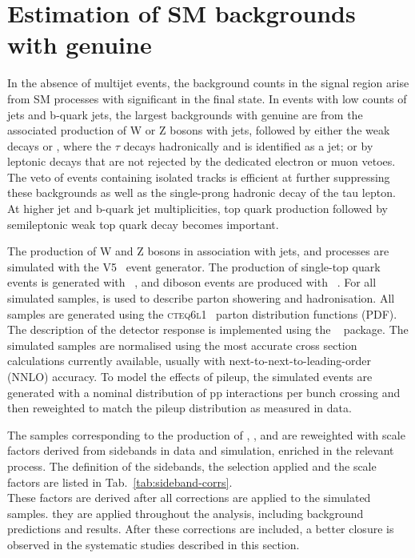 \section{Estimation of SM backgrounds with genuine \ptvecmiss}
\label{sec:ewk_background}

In the absence of multijet events, the background counts in the signal
region arise from SM processes with significant \ETmiss in the final
state. In events with low counts of jets and b-quark jets, the largest
backgrounds with genuine \ptvecmiss are from the associated production of
W or Z bosons with jets, followed by either the weak decays \znunu or
\wtaunu, where the $\tau$ decays hadronically and is identified as a
jet; or by leptonic decays that are not rejected by the dedicated
electron or muon vetoes. The veto of events containing isolated tracks
is efficient at further suppressing these backgrounds as well as the
single-prong hadronic decay of the tau lepton. At higher jet and
b-quark jet multiplicities, top quark production followed by
semileptonic weak top quark decay becomes important.

The production of W and Z bosons in association with jets, \ttbar and
\gj processes are simulated with the \MADGRAPH V5~\cite{madgraph}
event generator. The production of single-top quark events is
generated with \POWHEG~\cite{powheg}, and diboson events are produced
with ~\cite{pythia8}. For all simulated samples, 
is used to describe parton showering and hadronisation. All samples
are generated using the \textsc{cteq6l1}~\cite{Pumplin:2002vw} parton
distribution functions (PDF). The description of the detector response
is implemented using the \GEANTfour~\cite{geant} package. The
simulated samples are normalised using the most accurate cross section
calculations currently available, usually with
next-to-next-to-leading-order (NNLO) accuracy. To model the effects of
pileup, the simulated events are generated with a nominal distribution
of pp interactions per bunch crossing and then reweighted to match the
pileup distribution as measured in data.

The samples corresponding to the production of \gj, \wj, \zj and \ttj are reweighted 
with scale factors derived from sidebands in data and simulation, enriched in the relevant process. 
The definition of the sidebands, the selection applied and the scale factors are 
listed in Tab.~\ref{tab:sideband-corrs}. \\
These factors are derived after all corrections are applied to the simulated samples. 
they are applied throughout the analysis, including background predictions and results. 
After these corrections are included, a better closure is observed in the systematic studies 
described in this section. 

